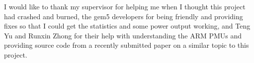 I would like to thank my supervisor for helping me when I thought this project 
had crashed and burned, the gem5 developers for being friendly and providing 
fixes so that I could get the statistics and some power output working, and 
Teng Yu and Runxin Zhong for their help with understanding the ARM PMUs and 
providing source code from a recently submitted paper on a similar topic to 
this project.
